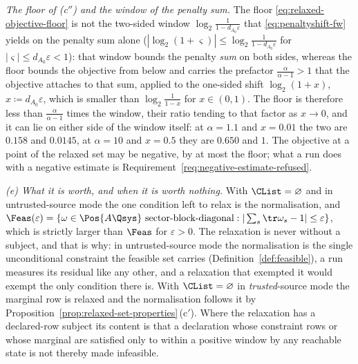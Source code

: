 \begin{remark}
\emph{The floor of (c$''$) and the window of the penalty sum.} The floor
\eqref{eq:relaxed-objective-floor} is not the two-sided window
$\log_2\frac{1}{1-d_{A_0}\varepsilon}$ that \eqref{eq:penaltyshift-fw}
yields on the penalty sum alone
($|\log_2(1+\varsigma)|\le\log_2\frac{1}{1-d_{A_0}\varepsilon}$ for
$|\varsigma|\le d_{A_0}\varepsilon<1$): that window bounds the penalty
\emph{sum} on both sides, whereas the floor bounds the objective from below
and carries the prefactor $\frac{\alpha}{\alpha-1}>1$ that the objective
attaches to that sum, applied to the one-sided shift
$\log_2(1+x)$, $x\coloneqq d_{A_0}\varepsilon$, which is smaller than
$\log_2\frac{1}{1-x}$ for $x\in(0,1)$. The floor is therefore less than
$\frac{\alpha}{\alpha-1}$ times the window, their ratio tending to that
factor as $x\to0$, and it can lie on either side of the window itself: at
$\alpha=1.1$ and $x=0.01$ the two are $0.158$ and $0.0145$, at $\alpha=10$
and $x=0.5$ they are $0.650$ and $1$. The objective at a point of the
relaxed set may be negative, by at most the floor; what a run does with a
negative estimate is Requirement~\ref{req:negative-estimate-refused}.

\emph{(e) What it is worth, and when it is worth nothing.} With
$\CList=\varnothing$ and in untrusted-source mode the one condition left
to relax is the normalisation, and
$\Feas(\varepsilon)=\{\omega\in\Pos{A\Qsys}\ \text{sector-block-diagonal}:
|\sum_s\tr\omega_s-1|\le\varepsilon\}$, which is strictly larger than
$\Feas$ for $\varepsilon>0$. The relaxation is never without a subject,
and that is why: in untrusted-source mode the normalisation is the single
unconditional constraint the feasible set carries
(Definition~\ref{def:feasible}), a run measures its residual like any
other, and a relaxation that exempted it would exempt the only condition
there is. With $\CList=\varnothing$ in \emph{trusted}-source mode the
marginal row is relaxed and the normalisation follows it by
Proposition~\ref{prop:relaxed-set-properties}\,(c$'$). Where the
relaxation has a declared-row subject its content is that a declaration
whose constraint rows or whose marginal are satisfied only to within a
positive window by any reachable state is not thereby made infeasible.


\end{remark}
